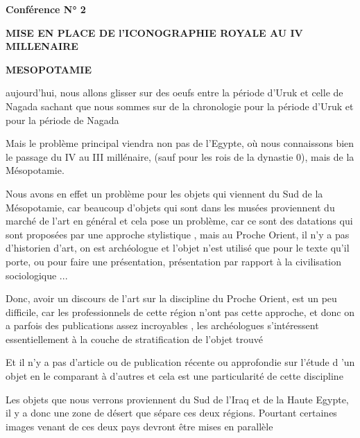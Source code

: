 \documentclass[a4paper,10pt]{article}
\begin{document}
\begin{itemize}


\textbf{Conférence N° 2}

\textbf{MISE EN PLACE DE l'ICONOGRAPHIE ROYALE AU IV
MILLENAIRE}

\textbf{MESOPOTAMIE}

aujourd'hui, nous allons glisser sur des oeufs entre la
période d'Uruk et celle de Nagada sachant que nous
sommes sur de la chronologie pour la période d'Uruk et
pour la période de Nagada

Mais le problème principal viendra non pas de l'Egypte,
où nous connaissons bien le passage du IV au III millénaire, (sauf pour
les rois de la dynastie 0), mais de la Mésopotamie.

Nous avons en effet un problème pour les objets qui viennent du Sud de
la Mésopotamie, car beaucoup d'objets qui sont dans
les musées proviennent du marché de l'art en général
et cela pose un problème, car ce sont des datations qui sont proposées
par une approche stylistique , mais au Proche Orient, il
n'y a pas d'historien
d'art, on est archéologue et l'objet
n'est utilisé que pour le texte qu'il
porte, ou pour faire une présentation, présentation par rapport à la
civilisation sociologique ...

Donc, avoir un discours de l'art sur la discipline du
Proche Orient, est un peu difficile, car les professionnels de cette
région n'ont pas cette approche, et donc on a parfois
des publications assez incroyables , les archéologues
s'intéressent essentiellement à la couche de
stratification de l'objet trouvé

Et il n'y a pas d'article ou de
publication récente ou approfondie sur l'étude d
'un objet en le comparant à d'autres
et cela est une particularité de cette discipline

Les objets que nous verrons proviennent du Sud de
l'Iraq et de la Haute Egypte, il y a donc une zone de
désert que sépare ces deux régions. Pourtant certaines images venant de
ces deux pays devront être mises en parallèle


\end{itemize}
\end{document}
